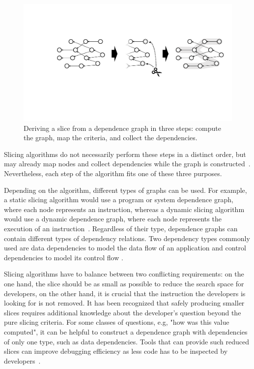 \documentclass[
			english,
			]{elsarticle}
\begin{document}
\begin{figure}
	\centering
		\includegraphics[width=\linewidth]{graph-slicing}
	\caption{Deriving a slice from a dependence graph in three steps: compute the graph, map the criteria, and collect the dependencies.}
	\label{fig:graph-slicing}
\end{figure}

Slicing algorithms do not necessarily perform these steps in a distinct order, but may already map nodes and collect dependencies while the graph is constructed~\cite{agrawal_dynamic_1990,zhang_precise_2003}.
Nevertheless, each step of the algorithm fits one of these three purposes.

Depending on the algorithm, different types of graphs can be used.
For example, a static slicing algorithm would use a program or system dependence graph, where each node represents an instruction, whereas a dynamic slicing algorithm would use a dynamic dependence graph, where each node represents the execution of an instruction~\cite{weiser_program_1981, korel_dynamic_1990}.
Regardless of their type, dependence graphs can contain different types of dependency relations.
Two dependency types commonly used are data dependencies to model the data flow of an application and control dependencies to model its control flow \cite{weiser_program_1981, agrawal_dynamic_1990, zhang_precise_2003, korel_dynamic_1990}.

Slicing algorithms have to balance between two conflicting requirements: 
on the one hand, the slice should be as small as possible to reduce the search space for developers,
on the other hand, it is crucial that the instruction the developers is looking for is not removed.
It has been recognized that safely producing smaller slices requires additional knowledge about the developer's question beyond the pure slicing criteria.
For some classes of questions, e.g, "how was this value computed", it can be helpful to construct a dependence graph with dependencies of only one type, such as data dependencies.
Tools that can provide such reduced slices can improve debugging efficiency as less code has to be inspected by developers~\cite{agrawal_debugging_1993, Sridharan:2007:TS:1273442.1250748}.
\end{document}
